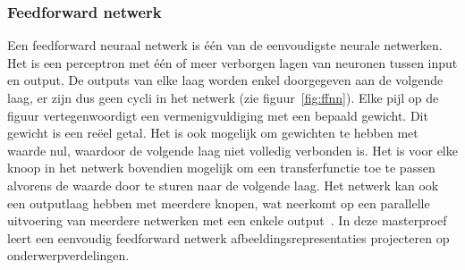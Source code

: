 \subsubsection{Feedforward netwerk}
\label{par:concept}
Een feedforward neuraal netwerk is \'e\'en van de eenvoudigste neurale netwerken. Het is een perceptron met \'e\'en of meer verborgen lagen van neuronen tussen input en output. De outputs van elke laag worden enkel doorgegeven aan de volgende laag, er zijn dus geen cycli in het netwerk (zie figuur~\ref{fig:ffnn}). Elke pijl op de figuur vertegenwoordigt een vermenigvuldiging met een bepaald gewicht. Dit gewicht is een re\"eel getal. Het is ook mogelijk om gewichten te hebben met waarde nul, waardoor de volgende laag niet volledig verbonden is. Het is voor elke knoop in het netwerk bovendien mogelijk om een transferfunctie toe te passen alvorens de waarde door te sturen naar de volgende laag. Het netwerk kan ook een outputlaag hebben met meerdere knopen, wat neerkomt op een parallelle uitvoering van meerdere netwerken met een enkele output~\cite{Bishop:1995:NNP:525960}. 
In deze masterproef leert een eenvoudig feedforward netwerk afbeeldingsrepresentaties projecteren op onderwerpverdelingen.

